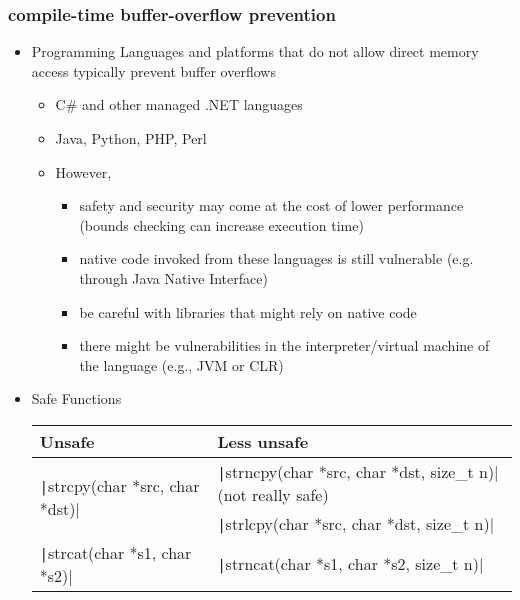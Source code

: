 \documentclass[final]{article}
\begin{document}
\subsubsection*{compile-time buffer-overflow prevention}
\begin{itemize}[nosep]
    \item Programming Languages and platforms that do not allow direct memory access typically prevent buffer overflows
          \begin{itemize}[nosep]
              \item C\# and other managed .NET languages
              \item Java, Python, PHP, Perl
              \item However,
                    \begin{itemize}[nosep]
                        \item safety and security may come at the cost of lower performance (bounds checking can increase execution time)
                        \item native code invoked from these languages is still vulnerable (e.g. through Java Native Interface)
                        \item be careful with libraries that might rely on native code
                        \item there might be vulnerabilities in the interpreter/virtual machine of the language (e.g., JVM or CLR)
                    \end{itemize}
          \end{itemize}
    \item Safe Functions
          \begin{table}[H]
              \begin{tabular}{ll}
                  Unsafe                                                        & Less unsafe                                                               \\\toprule
                  \multirow{2}{*}{\texttt|strcpy(char *src, char *dst)|} & \texttt|strncpy(char *src, char *dst, size_t n)| (not really safe) \\
                                                                                & \texttt|strlcpy(char *src, char *dst, size_t n)|                   \\\midrule
                  \multirow{2}{*}{\texttt|strcat(char *s1, char *s2)|}   & \texttt|strncat(char *s1, char *s2, size_t n)|                     \\

\end{tabular}
\end{table}
\end{itemize}
\end{document}
